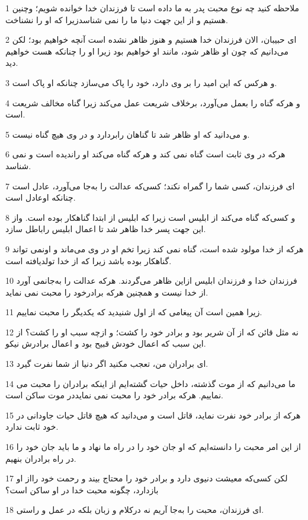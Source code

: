 \par 1 ملاحظه کنید چه نوع محبت پدر به ما داده است تا فرزندان خدا خوانده شویم؛ وچنین هستیم و از این جهت دنیا ما را نمی شناسدزیرا که او را نشناخت.
\par 2 ‌ای حبیبان، الان فرزندان خدا هستیم و هنوز ظاهر نشده است آنچه خواهیم بود؛ لکن می‌دانیم که چون او ظاهر شود، مانند او خواهیم بود زیرا او را چنانکه هست خواهیم دید.
\par 3 و هرکس که این امید را بر وی دارد، خود را پاک می‌سازد چنانکه او پاک است.
\par 4 و هرکه گناه را بعمل می‌آورد، برخلاف شریعت عمل می‌کند زیرا گناه مخالف شریعت است.
\par 5 و می‌دانید که او ظاهر شد تا گناهان رابردارد و در وی هیچ گناه نیست.
\par 6 هرکه در وی ثابت است گناه نمی کند و هرکه گناه می‌کند او راندیده است و نمی شناسد.
\par 7 ‌ای فرزندان، کسی شما را گمراه نکند؛ کسی‌که عدالت را به‌جا می‌آورد، عادل است چنانکه اوعادل است.
\par 8 و کسی‌که گناه می‌کند از ابلیس است زیرا که ابلیس از ابتدا گناهکار بوده است. واز این جهت پسر خدا ظاهر شد تا اعمال ابلیس راباطل سازد.
\par 9 هر‌که از خدا مولود شده است، گناه نمی کند زیرا تخم او در وی می‌ماند و اونمی تواند گناهکار بوده باشد زیرا که از خدا تولدیافته است.
\par 10 فرزندان خدا و فرزندان ابلیس ازاین ظاهر می‌گردند. هر‌که عدالت را به‌جانمی آورد از خدا نیست و همچنین هر‌که برادرخود را محبت نمی نماید.
\par 11 زیرا همین است آن پیغامی که از اول شنیدید که یکدیگر را محبت نماییم.
\par 12 نه مثل قائن که از آن شریر بود و برادر خود را کشت؛ و ازچه سبب او را کشت؟ از این سبب که اعمال خودش قبیح بود و اعمال برادرش نیکو.
\par 13 ‌ای برادران من، تعجب مکنید اگر دنیا از شما نفرت گیرد.
\par 14 ما می‌دانیم که از موت گذشته، داخل حیات گشته‌ایم از اینکه برادران را محبت می نماییم. هرکه برادر خود را محبت نمی نمایددر موت ساکن است.
\par 15 هر‌که از برادر خود نفرت نماید، قاتل است و می‌دانید که هیچ قاتل حیات جاودانی در خود ثابت ندارد.
\par 16 از این امر محبت را دانسته‌ایم که او جان خود را در راه ما نهاد و ما باید جان خود را در راه برادران بنهیم.
\par 17 لکن کسی‌که معیشت دنیوی دارد و برادر خود را محتاج بیند و رحمت خود رااز او باز‌دارد، چگونه محبت خدا در او ساکن است؟
\par 18 ‌ای فرزندان، محبت را به‌جا آریم نه درکلام و زبان بلکه در عمل و راستی.
